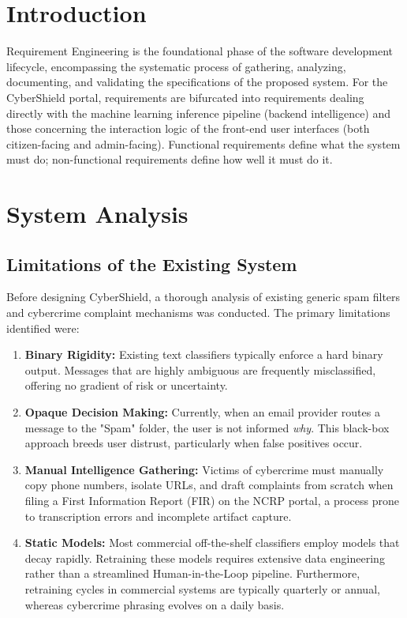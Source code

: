 \section{Introduction}
Requirement Engineering is the foundational phase of the software development lifecycle, encompassing the systematic process of gathering, analyzing, documenting, and validating the specifications of the proposed system. For the CyberShield portal, requirements are bifurcated into requirements dealing directly with the machine learning inference pipeline (backend intelligence) and those concerning the interaction logic of the front-end user interfaces (both citizen-facing and admin-facing). Functional requirements define what the system must do; non-functional requirements define how well it must do it.

\section{System Analysis}
\subsection{Limitations of the Existing System}
Before designing CyberShield, a thorough analysis of existing generic spam filters and cybercrime complaint mechanisms was conducted. The primary limitations identified were:
\begin{enumerate}
    \item \textbf{Binary Rigidity:} Existing text classifiers typically enforce a hard binary output. Messages that are highly ambiguous are frequently misclassified, offering no gradient of risk or uncertainty.
    \item \textbf{Opaque Decision Making:} Currently, when an email provider routes a message to the "Spam" folder, the user is not informed \textit{why}. This black-box approach breeds user distrust, particularly when false positives occur.
    \item \textbf{Manual Intelligence Gathering:} Victims of cybercrime must manually copy phone numbers, isolate URLs, and draft complaints from scratch when filing a First Information Report (FIR) on the NCRP portal, a process prone to transcription errors and incomplete artifact capture.
    \item \textbf{Static Models:} Most commercial off-the-shelf classifiers employ models that decay rapidly. Retraining these models requires extensive data engineering rather than a streamlined Human-in-the-Loop pipeline. Furthermore, retraining cycles in commercial systems are typically quarterly or annual, whereas cybercrime phrasing evolves on a daily basis.
\end{enumerate}

